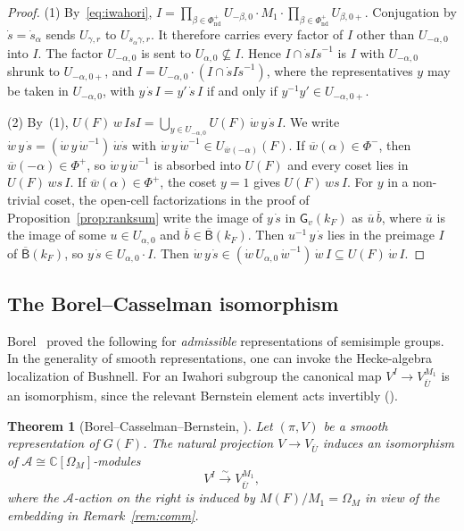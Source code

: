 \documentclass[11pt]{amsart}
\newtheorem{theorem}{Theorem}[section]
\theoremstyle{definition}
\theoremstyle{remark}
\newcommand{\CC}{\mathbb{C}}
\newcommand{\AAA}{\mathcal{A}}
\newcommand{\barr}[1]{\overline{#1}}
\begin{document}
\begin{proof}
(1) By~\eqref{eq:iwahori}, $I = \prod_{\beta\in\Phi^+_{\mathrm{nd}}} U_{-\beta,0}\cdot M_1\cdot \prod_{\beta\in\Phi^+_{\mathrm{nd}}} U_{\beta,0+}$.  Conjugation by $\dot{s} = \dot{s}_\alpha$ sends $U_{\gamma,r}$ to $U_{s_\alpha\gamma,r}$. It therefore carries every factor of $I$ other than $U_{-\alpha,0}$ into $I$. The factor $U_{-\alpha,0}$ is sent to $U_{\alpha,0}\not\subseteq I$. Hence $I\cap\dot{s}I\dot{s}^{-1}$ is $I$ with $U_{-\alpha,0}$ shrunk to $U_{-\alpha,0+}$, and $I = U_{-\alpha,0}\cdot(I\cap\dot{s}I\dot{s}^{-1})$, where the representatives $y$ may be taken in $U_{-\alpha,0}$, with $y\,\dot{s}\,I = y'\,\dot{s}\,I$ if and only if $y^{-1}y' \in U_{-\alpha,0+}$.

(2) By~(1), $U(F)\,w\,IsI = \bigcup_{y\in U_{-\alpha,0}} U(F)\,\dot{w}\,y\,\dot{s}\,I$. We write $\dot{w}\,y\,\dot{s} = (\dot{w}\,y\,\dot{w}^{-1})\,\dot{w}\dot{s}$ with $\dot{w}\,y\,\dot{w}^{-1}\in U_{\barr{w}(-\alpha)}(F)$. If $\barr{w}(\alpha)\in\Phi^-$, then $\barr{w}(-\alpha)\in\Phi^+$, so $\dot{w}\,y\,\dot{w}^{-1}$ is absorbed into $U(F)$ and every coset lies in $U(F)\,ws\,I$. If $\barr{w}(\alpha)\in\Phi^+$, the coset $y=1$ gives $U(F)\,ws\,I$. For $y$ in a non-trivial coset, the open-cell factorizations in the proof of Proposition~\ref{prop:ranksum} write the image of $y\,\dot{s}$ in $\mathsf{G}_v(k_F)$ as $\barr{u}\,\barr{b}$, where $\barr{u}$ is the image of some $u\in U_{\alpha,0}$ and $\barr{b}\in\barr{\mathsf{B}}(k_F)$. Then $u^{-1}\,y\,\dot{s}$ lies in the preimage $I$ of $\barr{\mathsf{B}}(k_F)$, so $y\,\dot{s}\in U_{\alpha,0}\cdot I$. Then $\dot{w}\,y\,\dot{s}\in(\dot{w}\,U_{\alpha,0}\,\dot{w}^{-1})\,\dot{w}\,I\subseteq U(F)\,\dot{w}\,I$.
\end{proof}


\subsection{The Borel--Casselman isomorphism}\label{ssec:BC}

Borel~\cite[Lem.~4.7]{Borel} proved the following for \emph{admissible} representations of semisimple groups. In the generality of smooth representations, one can invoke the Hecke-algebra localization of Bushnell. For an Iwahori subgroup the canonical map $V^I \to V_{\barr{U}}^{M_1}$ is an isomorphism, since the relevant Bernstein element acts invertibly (\cite[\S 3, Prop.~5, Thm.~1, Rem.~5--6]{Bushnell01}).

\begin{theorem}[Borel--Casselman--Bernstein, {\cite{Bushnell01}}]\label{thm:BC}
Let $(\pi,V)$ be a smooth representation of $G(F)$. The natural projection $V \to V_{\barr{U}}$ induces an isomorphism of $\AAA \cong \CC[\Omega_M]$-modules
\[
V^I \xrightarrow{\ \sim\ } V_{\barr{U}}^{M_1},
\]
where the $\AAA$-action on the right is induced by $M(F)/M_1 = \Omega_M$ in view of the embedding in Remark~\ref{rem:comm}.
\end{theorem}
\end{document}
